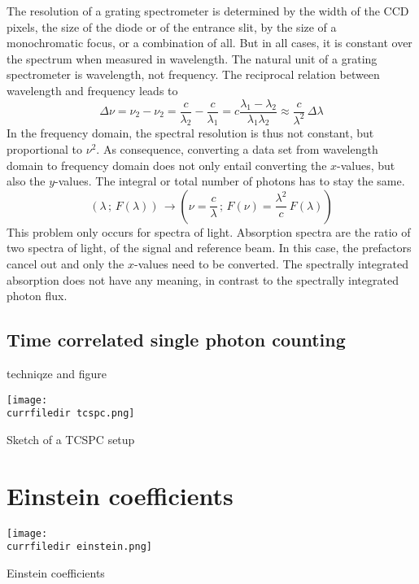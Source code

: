 The resolution of a grating spectrometer is determined by the width of the CCD pixels, the size of the diode or of the entrance slit, by the size of a monochromatic focus, or a combination of all. But in all cases, it is constant over the spectrum when measured in wavelength. The natural unit of a grating spectrometer is wavelength, not frequency. The reciprocal relation between wavelength and frequency leads to 
\[
 \Delta \nu = \nu_2 - \nu_2 = \frac{c}{\lambda_2} - \frac{c}{\lambda_1}  = c \frac{\lambda_1 - \lambda_2}{\lambda_1 \lambda_2} \approx \frac{c}{\lambda^2} \, \Delta \lambda
\]
In the frequency domain, the spectral resolution is thus not constant, but proportional to $\nu^2$. As consequence, converting a data set from wavelength domain to frequency domain does not only entail converting the $x$-values, but also the $y$-values. The integral or total number of photons has to stay the same.
\[
 \left( \lambda \, ; \, F(\lambda) \right) \, \rightarrow  \left( \nu = \frac{c}{ \lambda} \, ; \,  F(\nu) = \frac{\lambda^2}{ c } \, F(\lambda) \right) 
\]
This problem only occurs for spectra of light. Absorption spectra are the ratio of two spectra of light, of the signal and reference beam. In this case, the prefactors cancel out and only the $x$-values need to be converted. The spectrally integrated absorption does not have any meaning, in contrast to the spectrally integrated photon flux.



\subsection{Time correlated single photon counting}

techniqze and figure

\begin{marginfigure}
   \texttt{[image: \\currfiledir tcspc.png]}
  \caption{Sketch of a TCSPC setup}
\end{marginfigure}

\section{Einstein coefficients}

\begin{marginfigure}
   \texttt{[image: \\currfiledir einstein.png]}

  \caption{Einstein coefficients}
\end{marginfigure}


